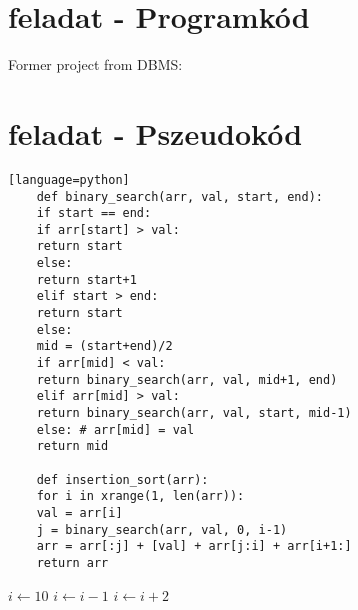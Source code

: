 \documentclass{article}
\theoremstyle{plain}\newtheorem{tet}{Tétel}
\theoremstyle{definition}\newtheorem{defin}{Definíció}
\theoremstyle{plain}\newtheorem{lemma}{Lemma}
\theoremstyle{remark}\newtheorem{feladat}{Feladat}
\begin{document}
\clearpage

\section{feladat - Programkód}
Former project from DBMS:
\begin{footnotesize}
	
\end{footnotesize}
\clearpage

\section{feladat - Pszeudokód}
	\begin{lstlisting}[frame = single][language=python]
	def binary_search(arr, val, start, end):
	if start == end:
	if arr[start] > val:
	return start
	else:
	return start+1
	elif start > end:
	return start
	else: 
	mid = (start+end)/2
	if arr[mid] < val:
	return binary_search(arr, val, mid+1, end)
	elif arr[mid] > val:
	return binary_search(arr, val, start, mid-1)
	else: # arr[mid] = val
	return mid
	
	def insertion_sort(arr):
	for i in xrange(1, len(arr)):
	val = arr[i]
	j = binary_search(arr, val, 0, i-1)
	arr = arr[:j] + [val] + arr[j:i] + arr[i+1:]
	return arr
\end{lstlisting}

\begin{algorithmic}
	\State $i \gets 10$
	\State $i \gets i-1$
	\Else
	\State $i \gets i+2$
	\EndIf
	\EndIf 
\end{algorithmic}
\end{document}
